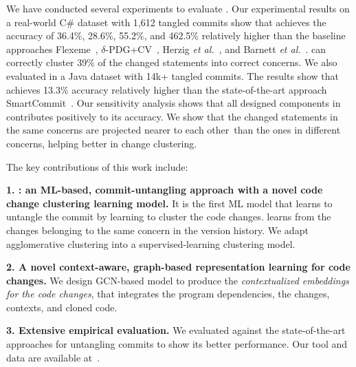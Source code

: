   We have conducted several experiments to evaluate
    {\tool}. Our experimental results on a real-world C\# dataset with
    1,612 tangled commits show that {\tool} achieves the
    accuracy of 36.4\%, 28.6\%, 55.2\%, and 462.5\% relatively higher
    than the baseline approaches Flexeme~\cite{flexeme-fse20},
    $\delta$-PDG+CV~\cite{flexeme-fse20}, Herzig {\em et
      al.}~\cite{kim-emse16}, and Barnett {\em et
      al.}~\cite{barnett-icse15}. {\tool} can correctly cluster 39\%
    of the changed statements into correct concerns.
%
  We also evaluated {\tool} in a Java dataset with 14k+ tangled commits. The results show that {\tool} achieves 13.3\%
  accuracy relatively higher than the state-of-the-art approach
  SmartCommit~\cite{smartcommit-fse21}. Our sensitivity analysis shows
  that all designed components in {\tool} contributes positively to
  its accuracy. We show that the changed statements in the
  same concerns are projected nearer to each other~than the ones in
  different concerns, helping {\tool} better in change clustering.

The key contributions of this work include:

{\bf 1. {\tool}: an ML-based, commit-untangling approach with a novel
  code change clustering learning model.} It is the first ML model
that learns to untangle the commit by learning to cluster the code
changes.  {\tool} learns from the changes belonging to the same
concern in the version history. We adapt agglomerative clustering
into a supervised-learning clustering model.

{\bf 2. A novel context-aware, graph-based representation learning for
  code changes.} We design GCN-based model to produce the {\em
  contextualized embeddings for the code changes}, that
integrates the program dependencies, the changes, contexts, and cloned code.

{\bf 3. Extensive empirical evaluation.} We evaluated {\tool} against
the state-of-the-art approaches for untangling commits to show its better
performance. Our tool and data are available at~\cite{utango-website}.

